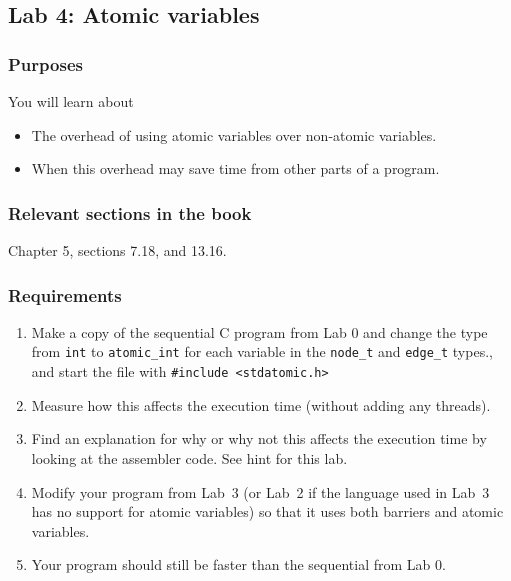 \documentclass{forsete}
\begin{document}
\newpage
\subsection*{Lab 4: Atomic variables}
\subsubsection*{Purposes}
You will learn about
\begin{itemize}
\item The overhead of using atomic variables over non-atomic variables.
\item When this overhead may save time from other parts of a program.
\end{itemize}

\subsubsection*{Relevant sections in the book}
Chapter 5, sections 7.18, and 13.16.
\subsubsection*{Requirements}
\begin{enumerate}
\item Make a copy of the sequential C program from Lab 0 and change the
type from \verb.int. to \verb.atomic_int. for each variable in the 
\verb.node_t. and \verb.edge_t. types., and start the file with \verb!#include <stdatomic.h>!
\item Measure how this affects the execution time (without adding any threads).
\item Find an explanation for why or why not this affects the execution time by looking at the 
assembler code. See hint for this lab. 

\item Modify your program from Lab~3 (or Lab~2 if the language used in Lab~3 has no support for atomic variables)
so that it uses both barriers and atomic variables.
\item Your program should still be faster than the sequential from Lab 0.
\end{enumerate}
\end{document}
